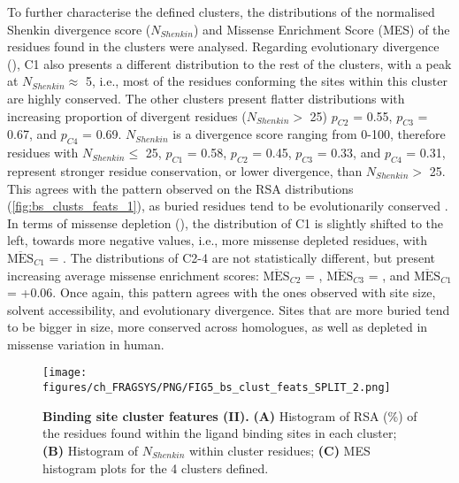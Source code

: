 To further characterise the defined clusters, the distributions of the normalised Shenkin divergence score ($N_{Shenkin}$) and Missense Enrichment Score (MES) of the residues found in the clusters were analysed. Regarding evolutionary divergence (), C1 also presents a different distribution to the rest of the clusters, with a peak at $N_{Shenkin} \approx$ 5, i.e., most of the residues conforming the sites within this cluster are highly conserved. The other clusters present flatter distributions with increasing proportion of divergent residues ($N_{Shenkin} >$ 25) $p_{C2}$ = 0.55, $p_{C3}$ = 0.67, and $p_{C4}$ = 0.69. $N_{Shenkin}$ is a divergence score ranging from 0-100, therefore residues with $N_{Shenkin} \leq$ 25, $p_{C1}$ = 0.58, $p_{C2}$ = 0.45, $p_{C3}$ = 0.33, and $p_{C4}$ = 0.31, represent stronger residue conservation, or lower divergence, than $N_{Shenkin} >$ 25. This agrees with the pattern observed on the RSA distributions (\autoref{fig:bs_clusts_feats_1}), as buried residues tend to be evolutionarily conserved \cite{CHOTHIA_1986_CONSERVATION, RUSSELL_1994_UNCONSERVATION}. In terms of missense depletion (), the distribution of C1 is slightly shifted to the left, towards more negative values, i.e., more missense depleted residues, with $\overline{\text{MES}}_{C1}$ = . The distributions of C2-4 are not statistically different, but present increasing average missense enrichment scores: $\overline{\text{MES}}_{C2}$ = , $\overline{\text{MES}}_{C3}$ = , and $\overline{\text{MES}}_{C1}$ = +0.06. Once again, this pattern agrees with the ones observed with site size, solvent accessibility, and evolutionary divergence. Sites that are more buried tend to be bigger in size, more conserved across homologues, as well as depleted in missense variation in human.

\begin{figure}[htb!]
    \centering
    \texttt{[image: figures/ch\_FRAGSYS/PNG/FIG5\_bs\_clust\_feats\_SPLIT\_2.png]}
    \caption[Binding site cluster features (II)]{\textbf{Binding site cluster features (II).} \textbf{(A)} Histogram of RSA (\%) of the residues found within the ligand binding sites in each cluster; \textbf{(B)} Histogram of $N_{Shenkin}$ within cluster residues; \textbf{(C)} MES histogram plots for the 4 clusters defined.}
    \label{fig:bs_clusts_feats_2}
\end{figure}


